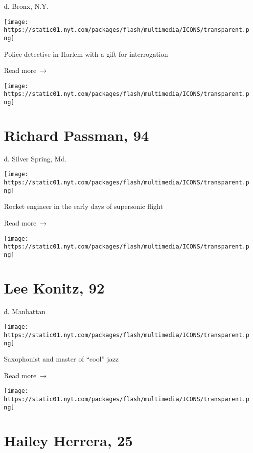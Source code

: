 d. Bronx, N.Y.

\texttt{[image: https://static01.nyt.com/packages/flash/multimedia/ICONS/transparent.png]}

Police detective in Harlem with a gift for interrogation

 Read more~→

\href{https://www.nytimes.com/2020/04/16/obituaries/richard-passman-dead-coronavirus.html}{}

\texttt{[image: https://static01.nyt.com/packages/flash/multimedia/ICONS/transparent.png]}

\hypertarget{richard-passman-94}{%
\section{Richard Passman, 94}\label{richard-passman-94}}

d. Silver Spring, Md.

\texttt{[image: https://static01.nyt.com/packages/flash/multimedia/ICONS/transparent.png]}

Rocket engineer in the early days of supersonic flight

 Read more~→

\href{https://www.nytimes.com/2020/04/16/arts/music/lee-konitz-dead-coronavirus.html}{}

\texttt{[image: https://static01.nyt.com/packages/flash/multimedia/ICONS/transparent.png]}

\hypertarget{lee-konitz-92}{%
\section{Lee Konitz, 92}\label{lee-konitz-92}}

d. Manhattan

\texttt{[image: https://static01.nyt.com/packages/flash/multimedia/ICONS/transparent.png]}

Saxophonist and master of ``cool'' jazz

 Read more~→

\href{https://www.nytimes.com/2020/04/15/nyregion/hailey-herrera-dead-coronavirus.html}{}

\texttt{[image: https://static01.nyt.com/packages/flash/multimedia/ICONS/transparent.png]}

\hypertarget{hailey-herrera-25}{%
\section{Hailey Herrera, 25}\label{hailey-herrera-25}}


